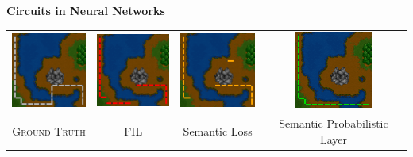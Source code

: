 \documentclass[aspectratio=169]{beamer}
\begin{document}
\begin{frame}[fragile]{\textbf{Circuits in Neural Networks}}
\begin{center}
  \begin{tabular}{cccc}
    \includegraphics[width=0.2\linewidth]{figures/spl-imgs/570_gt.png}
    & \includegraphics[width=0.2\linewidth]{figures/spl-imgs/570_base.png}
    & \includegraphics[width=0.2\linewidth]{figures/spl-imgs/570_sl.png}
    & \includegraphics[width=0.2\linewidth]{figures/spl-imgs/570_op.png}
    \\
    {\scriptsize\textsc{Ground Truth}} & {\scriptsize\textsc{FIL}} & {\scriptsize Semantic Loss} & 
    {\scriptsize Semantic Probabilistic Layer}
  \end{tabular}
\end{center}

\vfill

\textcolor{dark gray}{\scriptsize\citep{kareem22}}

\end{frame}

\end{document}

